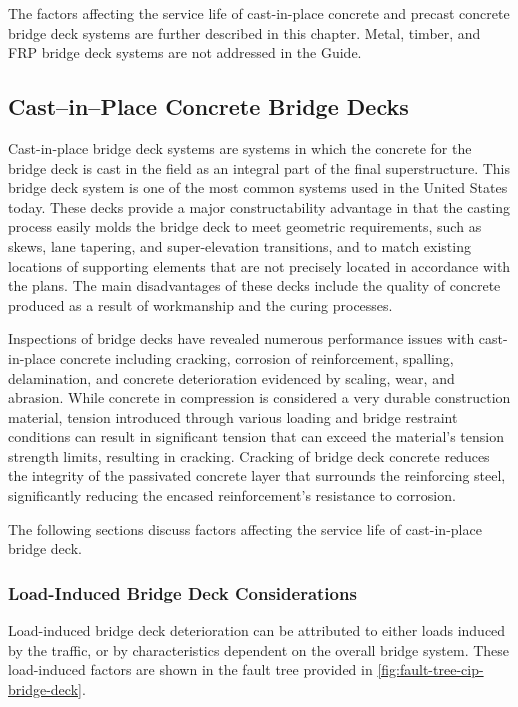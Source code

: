 The factors affecting the service life of cast-in-place concrete and precast concrete bridge deck systems are further described in this chapter. Metal, timber, and FRP bridge deck systems are not addressed in the Guide.

\subsection{Cast–in–Place Concrete Bridge Decks}
\label{subsec:cast-in-place-concrete-bridge-decks}
Cast-in-place bridge deck systems are systems in which the concrete for the bridge deck is cast in the field as an integral part of the final superstructure. This bridge deck system is one of the most common systems used in the United States today. These decks provide a major constructability advantage in that the casting process easily molds the bridge deck to meet geometric requirements, such as skews, lane tapering, and super-elevation transitions, and to match existing locations of supporting elements that are not precisely located in accordance with the plans. The main disadvantages of these decks include the quality of concrete produced as a result of workmanship and the curing processes.

Inspections of bridge decks have revealed numerous performance issues with cast-in-place concrete including cracking, corrosion of reinforcement, spalling, delamination, and concrete deterioration evidenced by scaling, wear, and abrasion. While concrete in compression is considered a very durable construction material, tension introduced through various loading and bridge restraint conditions can result in significant tension that can exceed the material's tension strength limits, resulting in cracking. Cracking of bridge deck concrete reduces the integrity of the passivated concrete layer that surrounds the reinforcing steel, significantly reducing the encased reinforcement’s resistance to corrosion.

The following sections discuss factors affecting the service life of cast-in-place bridge deck.

\subsubsection{Load-Induced Bridge Deck Considerations}
\label{subsubsec:load-induced-bridge-deck-considerations}
Load-induced bridge deck deterioration can be attributed to either loads induced by the traffic, or by characteristics dependent on the overall bridge system. These load-induced factors are shown in the fault tree provided in \cref{fig:fault-tree-cip-bridge-deck}.

